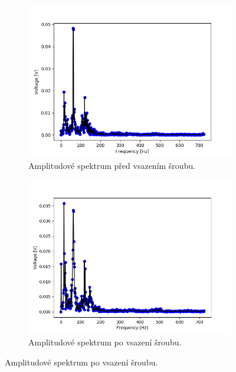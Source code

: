         \begin{figure} [!htp]
            \centering
            \caption{První experiment – amplitudová spektra.}
            \begin{subfigure}[b]{0.48\textwidth}
                 \centering
                 \includegraphics[width=\textwidth]{Experiment/Figs/3000_rpm_1khz_ok.png}
                 \caption {Amplitudové spektrum před vsazením šroubu.}
                 \label{figure:amplitude_01}
             \end{subfigure}
             \hfill
            \begin{subfigure}[b]{0.48\textwidth}
                \includegraphics[width=\textwidth]{Experiment/Figs/3000_rpm_1khz_nail.png}
                \caption {Amplitudové spektrum po vsazení šroubu.}
                \label{figure:amplitude_02}
            \end{subfigure}
        \end{figure} 
    
